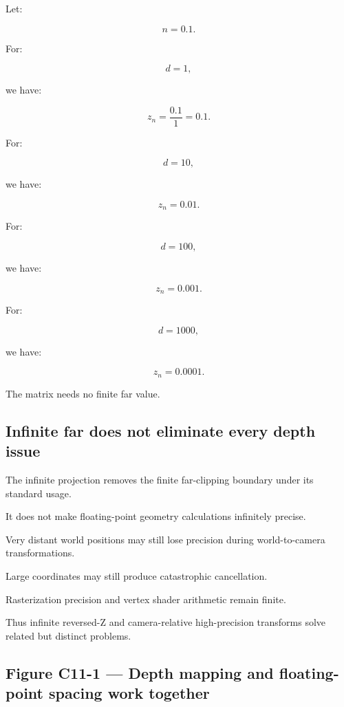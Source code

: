 Let:

\[
 n=0.1.
\]

For:

\[
 d=1,
\]

we have:

\[
 z_n=\frac{0.1}{1}=0.1.
\]

For:

\[
 d=10,
\]

we have:

\[
 z_n=0.01.
\]

For:

\[
 d=100,
\]

we have:

\[
 z_n=0.001.
\]

For:

\[
 d=1000,
\]

we have:

\[
 z_n=0.0001.
\]

The matrix needs no finite far value.

\subsection{Infinite far does not eliminate every depth issue}\label{02-foundations-ii-ch033-infinite-far-does-not-eliminate-every-depth-issue}

\hypertarget{02-foundations-ii-ch033-infinite-far-does-not-eliminate-every-depth-issue}{}

The infinite projection removes the finite far-clipping boundary under its standard usage.

It does not make floating-point geometry calculations infinitely precise.

Very distant world positions may still lose precision during world-to-camera transformations.

Large coordinates may still produce catastrophic cancellation.

Rasterization precision and vertex shader arithmetic remain finite.

Thus infinite reversed-Z and camera-relative high-precision transforms solve related but distinct problems.

\subsection{Figure C11-1 --- Depth mapping and floating-point spacing work together}\label{02-foundations-ii-ch033-figure-c11-1-depth-mapping-and-floating-point-spacing-work-together}

